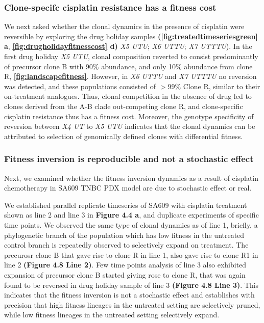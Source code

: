 

\subsubsection {Clone-specifc cisplatin resistance has a fitness cost}
We next asked whether the clonal dynamics in the presence of cisplatin were reversible by exploring the drug holiday samples \textbf{(\autoref{fig:treatedtimeseriesgreen} a}, \textbf{\autoref{fig:drugholidayfitnesscost} d)} \textit{X5 UTU}; \textit{X6 UTTU}; \textit{X7 UTTTU}). In the first drug holiday \textit{X5 UTU}, clonal composition reverted to consist predominantly of precursor clone B with 90\% abundance, and only 10\% abundance from clone R, \textbf{\autoref{fig:landscapefitness}}.  However, in \textit{X6 UTTU} and \textit{X7 UTTTU} no reversion was detected, and these populations consisted of  $>$99\% Clone R, similar to their on-treatment analogues. Thus, clonal competition in the absence of drug led to clones derived from the A-B clade out-competing clone R, and clone-specific cisplatin resistance thus has a fitness cost. Moreover, the genotype specificity of reversion between \textit{X4 UT} to \textit{X5 UTU} indicates that the clonal dynamics can be attributed to selection of genomically defined clones with differential fitness. 


\subsubsection{Fitness inversion is reproducible and not a stochastic effect}
Next, we examined whether the fitness inversion dynamics as a result of cisplatin chemotherapy in SA609 TNBC PDX model are due to stochastic effect or real.

We established parallel replicate timeseries of SA609 with cisplatin treatment shown as line 2 and line 3 in \textbf{Figure 4.4 a}, and duplicate experiments of specific time points. We observed the same type of clonal dynamics as of line 1, briefly, a phylogenetic branch of the population which has low fitness in the untreated control branch is repeatedly observed to selectively expand on treatment. The precurosr clone B that gave rise to clone R in line 1, also gave rise to clone R1 in line 2 \textbf{(Figure 4.8 Line 2)}. Few time points analysis of line 3 also exhibited expansion of precursor clone B started giving rose to clone R, that was again found to be reversed in drug holiday sample of line 3 \textbf{(Figure 4.8 Line 3)}. This indicates that the fitness inversion is not a stochastic effect and establishes with precision that high fitness lineages in the untreated setting are selectively pruned, while low fitness lineages in the untreated setting selectively expand.

